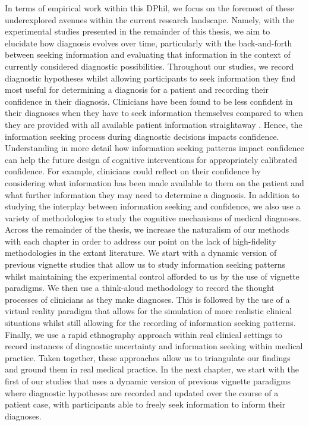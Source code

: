 \documentclass[a4paper, nobind]{templates/ociamthesis}
\begin{document}
In terms of empirical work within this DPhil, we focus on the foremost of these underexplored avenues within the current research landscape. Namely, with the experimental studies presented in the remainder of this thesis, we aim to elucidate how diagnosis evolves over time, particularly with the back-and-forth between seeking information and evaluating that information in the context of currently considered diagnostic possibilities. Throughout our studies, we record diagnostic hypotheses whilst allowing participants to seek information they find most useful for determining a diagnosis for a patient and recording their confidence in their diagnosis. Clinicians have been found to be less confident in their diagnoses when they have to seek information themselves compared to when they are provided with all available patient information straightaway \autocite{gruppen_information_1991}. Hence, the information seeking process during diagnostic decisions impacts confidence. Understanding in more detail how information seeking patterns impact confidence can help the future design of cognitive interventions for appropriately calibrated confidence. For example, clinicians could reflect on their confidence by considering what information has been made available to them on the patient and what further information they may need to determine a diagnosis. In addition to studying the interplay between information seeking and confidence, we also use a variety of methodologies to study the cognitive mechanisms of medical diagnoses. Across the remainder of the thesis, we increase the naturalism of our methods with each chapter in order to address our point on the lack of high-fidelity methodologies in the extant literature. We start with a dynamic version of previous vignette studies that allow us to study information seeking patterns whilst maintaining the experimental control afforded to us by the use of vignette paradigms. We then use a think-aloud methodology to record the thought processes of clinicians as they make diagnoses. This is followed by the use of a virtual reality paradigm that allows for the simulation of more realistic clinical situations whilst still allowing for the recording of information seeking patterns. Finally, we use a rapid ethnography approach within real clinical settings to record instances of diagnostic uncertainty and information seeking within medical practice. Taken together, these approaches allow us to triangulate our findings and ground them in real medical practice. In the next chapter, we start with the first of our studies that uses a dynamic version of previous vignette paradigms where diagnostic hypotheses are recorded and updated over the course of a patient case, with participants able to freely seek information to inform their diagnoses.
\end{document}
